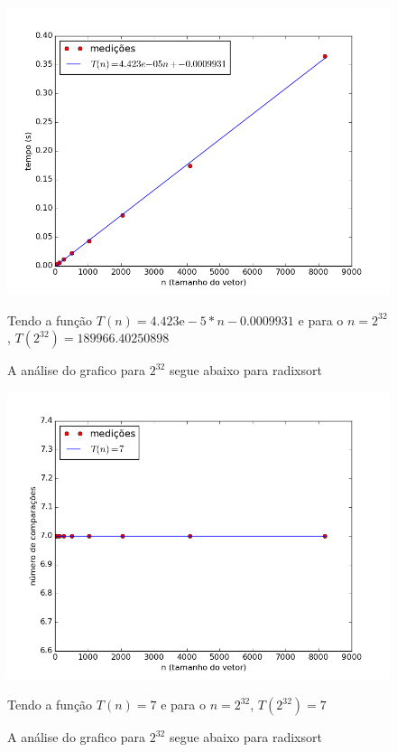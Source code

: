 \documentclass[12pt,a4paper,twoside]{report}
\begin{document}


\begin{figure}[ht]
\centering \includegraphics[scale=0.8]{../radixsort/imagens/radixsortQuaseCresc400.png}
\caption{A análise do grafico para $2^{32}$ segue abaixo para radixsort}

Tendo a função $T(n) = 4.423\mathrm{e}-5*n-0.0009931$ e para o $n =2^{32}$, $T(2^{32}) =189966.40250898$
\label{fig:radixsortQuaseCresc400}
\end{figure}

\begin{figure}[ht]
\centering \includegraphics[scale=0.8]{../radixsort/imagens/radixsortQuaseCresc401.png}
\caption{A análise do grafico para $2^{32}$ segue abaixo para radixsort}

Tendo a função $T(n) = 7$ e para o $n =2^{32}$, $T(2^{32}) = 7$
\label{fig:radixsortQuaseCresc401}
\end{figure}
\end{document}
